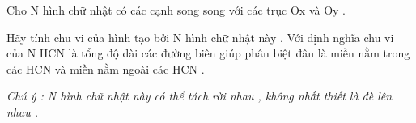 Cho N hình chữ nhật có các cạnh song song với các trục Ox và Oy .   


   Hãy tính chu vi của hình tạo bởi N hình chữ nhật này . Với định nghĩa chu vi của N HCN là tổng độ dài các đường biên giúp phân biệt đâu là miền nằm trong các HCN và miền nằm ngoài các HCN .   


\textit{    Chú ý : N hình chữ nhật này có thể tách rời nhau , không nhất thiết là đè lên nhau .   }